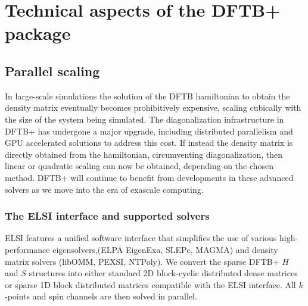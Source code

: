 \documentclass{revtex4-1}
\newcommand{\dftbp}{DFTB+}
\begin{document}
\section{Technical aspects of the \dftbp{} package}


\subsection{Parallel scaling}

In large-scale simulations the solution of the DFTB hamiltonian to obtain the
density matrix eventually becomes prohibitively expensive, scaling cubically
with the size of the system being simulated. The diagonalization infrastructure
in \dftbp{} has undergone a major upgrade, including distributed parallelism and
GPU accelerated solutions to address this cost. If instead the density matrix is
directly obtained from the hamiltonian, circumventing diagonalization, then
linear or quadratic scaling can now be obtained, depending on the chosen method.
\dftbp{} will continue to benefit from developments in these advanced solvers as
we move into the era of exascale computing.


\subsubsection{The ELSI interface and supported solvers}
\label{sec:elsi}

ELSI\cite{elsi_yu_2018} features a unified software interface that simplifies
the use of various high-performance eigensolvers,(ELPA\cite{elpa_marek_2014}
EigenExa,\cite{eigenexa_imamura_2011} SLEPc,\cite{slepc_hernandez_2005}
MAGMA\cite{magma_dongarra_2014}) and density matrix solvers
(libOMM,\cite{libomm_corsetti_2014} PEXSI,\cite{pexsi_lin_2013}
NTPoly\cite{ntpoly_dawson_2018}). We convert the sparse \dftbp{} $H$ and $S$
structures\cite{aradi-jpca-2007} into either standard 2D block-cyclic
distributed dense matrices or sparse 1D block distributed matrices compatible
with the ELSI interface. All $k$-points and spin channels are then solved in
parallel.
\end{document}
